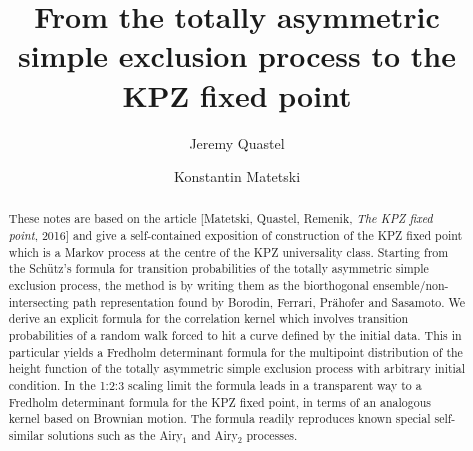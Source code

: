 \documentclass[]{pcmi}
\theoremstyle{plain}
\theoremstyle{definition}
\begin{document}
%
%
%
%
%
%

\title{From the totally asymmetric simple exclusion process to the KPZ fixed point}

%    
%    
\author{Jeremy Quastel \and Konstantin Matetski}
\address{University of Toronto, 40 St. George Street, Toronto, Ontario, Canada M5S 2E4}
%    
%    

\begin{abstract}
These notes are based on the article [Matetski, Quastel, Remenik, \emph {The KPZ fixed point}, 2016] and give a self-contained exposition of construction of the KPZ fixed point which is a Markov process at the centre of the KPZ universality class. Starting from the Sch\"{u}tz's formula for transition probabilities of the totally asymmetric simple exclusion process, the method is by writing them as the biorthogonal ensemble/non-intersecting path representation found by Borodin, Ferrari, Pr\"{a}hofer and Sasamoto. We derive an explicit formula for the correlation kernel which involves transition probabilities of a random walk forced to hit a curve defined by the initial data. This in particular yields a Fredholm determinant formula for the multipoint distribution of the height function of the totally asymmetric simple exclusion process with arbitrary initial condition. In the 1:2:3 scaling limit the formula leads in a transparent way to a Fredholm determinant formula for the KPZ fixed point, in terms of an analogous kernel based on Brownian motion. The formula readily reproduces known special self-similar solutions such as the Airy$_1$ and Airy$_2$ processes.
\end{abstract}  
\end{document}
